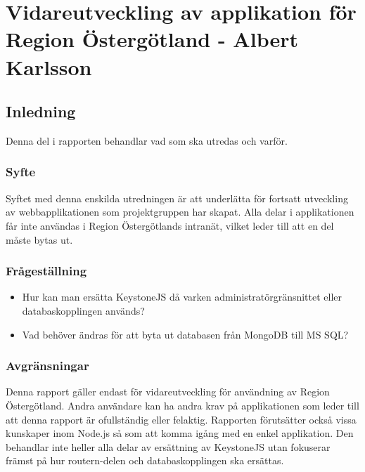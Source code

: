 \section{Vidareutveckling av applikation för Region Östergötland - Albert Karlsson}
\subsection{Inledning}
Denna del i rapporten behandlar vad som ska utredas och varför.
\subsubsection{Syfte}
Syftet med denna enskilda utredningen är att underlätta för fortsatt utveckling av webbapplikationen som projektgruppen har skapat. Alla delar i applikationen får inte användas i Region Östergötlands intranät, vilket leder till att en del måste bytas ut.
\subsubsection{Frågeställning}
\begin{itemize}
\item Hur kan man ersätta KeystoneJS då varken administratörgränsnittet eller databaskopplingen används?
\item Vad behöver ändras för att byta ut databasen från MongoDB till MS SQL?


\end{itemize}
\subsubsection{Avgränsningar}
Denna rapport gäller endast för vidareutveckling för användning av Region Östergötland. Andra användare kan ha andra krav på applikationen som leder till att denna rapport är ofullständig eller felaktig. Rapporten förutsätter också vissa kunskaper inom Node.js så som att komma igång med en enkel applikation. Den behandlar inte heller alla delar av ersättning av KeystoneJS utan fokuserar främst på hur routern-delen och databaskopplingen ska ersättas.  
